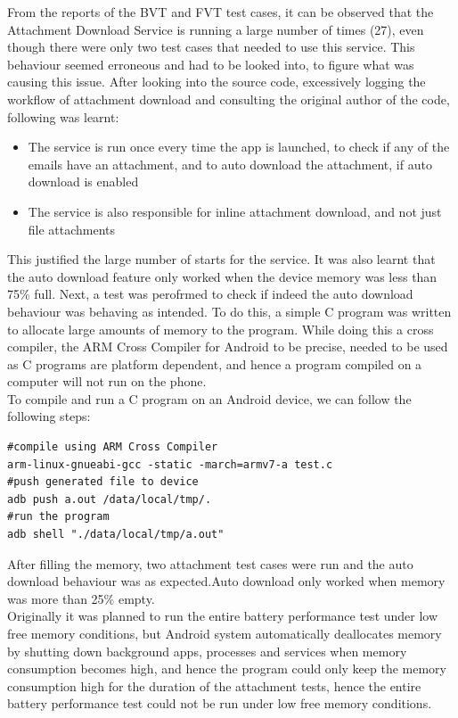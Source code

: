 From the reports of the BVT and FVT test cases, it can be observed that the Attachment Download Service is running a large number of times (27), even though there were only two test cases that needed to use this service. This behaviour seemed erroneous and had to be looked into, to figure what was causing this issue. After looking into the source code, excessively logging the workflow of attachment download and consulting the original author of the code, following was learnt:
\begin{itemize}
	\item The service is run once every time the app is launched, to check if any of the emails have an attachment, and to auto download the attachment, if auto download is enabled
	\item The service is also responsible for inline attachment download, and not just file attachments
\end{itemize}
This justified the large number of starts for the service. It was also learnt that the auto download feature only worked when the device memory was less than 75\% full. Next, a test was perofrmed to check if indeed the auto download behaviour was behaving as intended. To do this, a simple C program was written to allocate large amounts of memory to the program. While doing this a cross compiler, the ARM Cross Compiler for Android to be precise, needed to be used as C programs are platform dependent, and hence a program compiled on a computer will not run on the phone.\\

To compile and run a C program on an Android device, we can follow the following steps:
\begin{lstlisting}[style=ShellStyle]
#compile using ARM Cross Compiler
arm-linux-gnueabi-gcc -static -march=armv7-a test.c 
#push generated file to device
adb push a.out /data/local/tmp/.
#run the program
adb shell "./data/local/tmp/a.out"  
\end{lstlisting}
After filling the memory, two attachment test cases were run and the auto download behaviour was as expected.Auto download only worked when memory was more than 25\% empty.\\

Originally it was planned to run the entire battery performance test under low free memory conditions, but Android system automatically deallocates memory by shutting down background apps, processes and services when memory consumption becomes high, and hence the program could only keep the memory consumption high for the duration of the attachment tests, hence the entire battery performance test could not be run under low free memory conditions. \\

